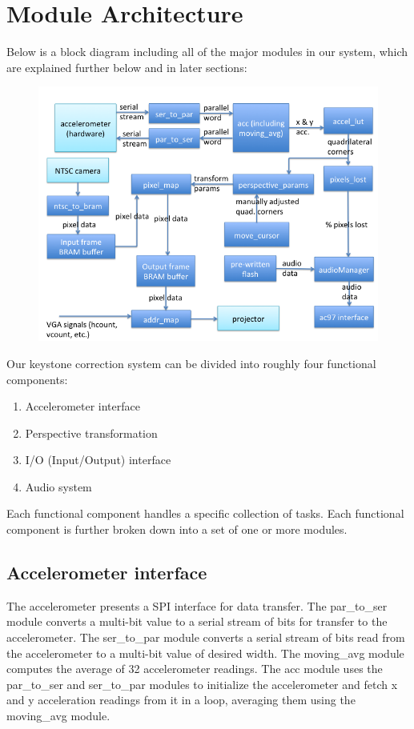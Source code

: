 \documentclass{article}
\begin{document}
\section{Module Architecture}
Below is a block diagram including all of the major modules in our system, which are explained further below and in later sections:
\begin{center}
\begin{figure}[H]
\includegraphics[width=\textwidth]{./img/block_diag}
\end{figure}
\end{center}

Our keystone correction system can be divided into roughly four functional components:
\begin{enumerate}
\item Accelerometer interface
\item Perspective transformation
\item I/O (Input/Output) interface
\item Audio system
\end{enumerate}

Each functional component handles a specific collection of tasks. Each functional component is further broken down into a set of one or more modules. 

\subsection{Accelerometer interface}
The accelerometer presents a SPI interface for data transfer. The par\_to\_ser module converts a multi-bit value to a serial stream of bits for transfer to the accelerometer. The ser\_to\_par module converts a serial stream of bits read from the accelerometer to a multi-bit value of desired width. The moving\_avg module computes the average of 32 accelerometer readings. The acc module uses the par\_to\_ser and ser\_to\_par modules to initialize the accelerometer and fetch x and y acceleration readings from it in a loop, averaging them using the moving\_avg module.
\end{document}
